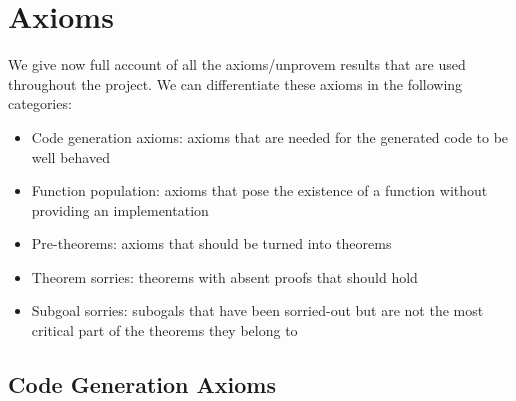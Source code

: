 \chapter{Axioms}

We give now full account of all the axioms/unprovem results that are used
throughout the project.
We can differentiate these axioms in the following categories:

\begin{itemize}
\item Code generation axioms: axioms that are needed for the generated code to be well
  behaved
\item Function population: axioms that pose the existence of a function without
  providing an implementation
\item Pre-theorems: axioms that should be turned into theorems
\item Theorem sorries: theorems with absent proofs that should hold
\item Subgoal sorries: subogals that have been sorried-out but are not the most
  critical part of the theorems they belong to
\end{itemize}

\section{Code Generation Axioms}
